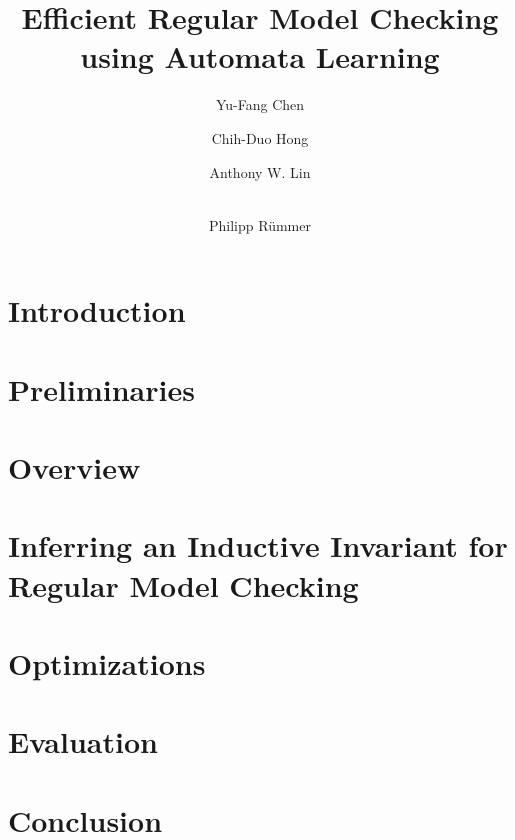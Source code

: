 \documentclass{llncs}
\title{Efficient Regular Model Checking using Automata Learning}
\author{
Yu-Fang Chen\inst{1}
\and
Chih-Duo Hong\inst{1,2}
\and
Anthony W. Lin\inst{2}
\and\\
Philipp R\"ummer\inst{3}
}
\institute
{
Academia Sinica
\and
Oxford University
\and
Uppsala Univeristy
}
\begin{document}
\maketitle

\begin{abstract}
 
\end{abstract}

\section{Introduction}
\label{section:introduction}


\section{Preliminaries}
\label{section:preliminaries}


\section{Overview}
\label{section:overview}


\section{Inferring an Inductive Invariant for Regular Model Checking}
\label{section:inferring}


\section{Optimizations}
\label{section:optimizations}



\section{Evaluation}
\label{section:evaluation}


\section{Conclusion}
\label{section:conclusion}





\end{document}
